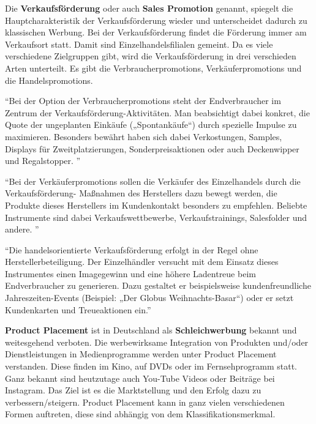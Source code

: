 Die \textbf{Verkaufsförderung} oder auch \textbf{Sales Promotion} genannt, spiegelt die Hauptcharakteristik der Verkaufsförderung wieder und unterscheidet dadurch zu klassischen Werbung. Bei der Verkaufsförderung findet die Förderung immer am Verkaufsort statt. Damit sind Einzelhandelsfilialen gemeint. Da es viele verschiedene Zielgruppen gibt, wird die Verkaufsförderung in drei verschieden Arten unterteilt. Es gibt die Verbraucherpromotions, Verkäuferpromotions und die Handelspromotions.

\enquote{Bei der Option der Verbraucherpromotions steht der Endverbraucher im Zentrum  der  Verkaufsförderung-Aktivitäten.  Man  beabsichtigt  dabei konkret, die Quote der ungeplanten  Einkäufe  („Spontankäufe“)  durch  spezielle  Impulse  zu  maximieren.  Besonders  bewährt  haben  sich  dabei  Verkostungen,  Samples,  Displays für  Zweitplatzierungen,  Sonderpreisaktionen  oder  auch  Deckenwipper  und Regalstopper. } \autocite[Vgl.][]{MarketingMB}

\enquote{Bei der Verkäuferpromotions sollen die Verkäufer des Einzelhandels durch die Verkaufsförderung- Maßnahmen des Herstellers dazu bewegt werden, die Produkte dieses Herstellers  im  Kundenkontakt  besonders  zu  empfehlen.  Beliebte  Instrumente sind dabei Verkaufswettbewerbe, Verkaufstrainings, Salesfolder und andere. } \autocite[Vgl.][]{MarketingMB}

\enquote{Die handelsorientierte Verkaufsförderung erfolgt in der Regel ohne Herstellerbeteiligung. Der Einzelhändler versucht mit dem Einsatz dieses  Instrumentes  einen  Imagegewinn  und  eine  höhere  Ladentreue  beim Endverbraucher  zu  generieren.  Dazu  gestaltet  er  beispielsweise  kundenfreundliche  Jahreszeiten-Events  (Beispiel:  „Der  Globus  Weihnachts-Basar“) oder er setzt Kundenkarten und Treueaktionen ein.} \autocite[Vgl.][]{MarketingMB}

\textbf{Product Placement} ist in Deutschland als \textbf{Schleichwerbung} bekannt und weitesgehend verboten. Die werbewirksame Integration von Produkten und/oder  Dienstleistungen  in  Medienprogramme werden unter Product Placement verstanden. Diese finden im Kino, auf DVDs oder im Fernsehprogramm statt. Ganz bekannt sind heutzutage auch You-Tube Videos oder Beiträge bei Instagram. Das Ziel ist es die Marktstellung und den Erfolg dazu zu verbessern/steigern. Product Placement kann in ganz vielen verschiedenen Formen auftreten, diese sind abhängig von dem Klassifikationsmerkmal.

